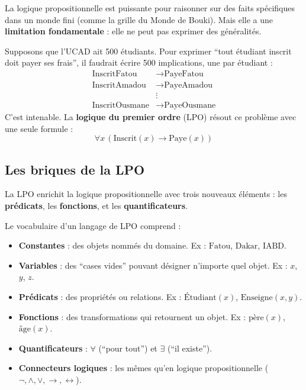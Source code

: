 \documentclass[11pt,a4paper]{article}
\begin{document}
La logique propositionnelle est puissante pour raisonner sur des faits spécifiques dans un monde fini (comme la grille du Monde de Bouki). Mais elle a une \textbf{limitation fondamentale} : elle ne peut pas exprimer des généralités.

\begin{exemplebox}
Supposons que l'UCAD ait 500 étudiants. Pour exprimer ``tout étudiant inscrit doit payer ses frais'', il faudrait écrire 500 implications, une par étudiant :
\begin{align*}
\text{InscritFatou} &\rightarrow \text{PayeFatou} \\
\text{InscritAmadou} &\rightarrow \text{PayeAmadou} \\
&\vdots \\
\text{InscritOusmane} &\rightarrow \text{PayeOusmane}
\end{align*}
C'est intenable. La \textbf{logique du premier ordre} (LPO) résout ce problème avec une seule formule :
$$\forall x \, (\text{Inscrit}(x) \rightarrow \text{Paye}(x))$$
\end{exemplebox}

\subsection{Les briques de la LPO}

La LPO enrichit la logique propositionnelle avec trois nouveaux éléments : les \textbf{prédicats}, les \textbf{fonctions}, et les \textbf{quantificateurs}.

\begin{definitionbox}
Le vocabulaire d'un langage de LPO comprend :
\begin{itemize}[nosep]
    \item \textbf{Constantes} : des objets nommés du domaine. Ex : $\text{Fatou}$, $\text{Dakar}$, $\text{IABD}$.
    \item \textbf{Variables} : des ``cases vides'' pouvant désigner n'importe quel objet. Ex : $x$, $y$, $z$.
    \item \textbf{Prédicats} : des propriétés ou relations. Ex : $\text{Étudiant}(x)$, $\text{Enseigne}(x, y)$.
    \item \textbf{Fonctions} : des transformations qui retournent un objet. Ex : $\text{père}(x)$, $\text{âge}(x)$.
    \item \textbf{Quantificateurs} : $\forall$ (``pour tout'') et $\exists$ (``il existe'').
    \item \textbf{Connecteurs logiques} : les mêmes qu'en logique propositionnelle ($\neg, \land, \lor, \rightarrow, \leftrightarrow$).
\end{itemize}
\end{definitionbox}
\end{document}
